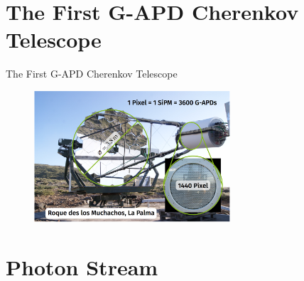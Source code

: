 



\maketitle

\section{The First G-APD Cherenkov Telescope}

\begin{frame}[t]{The First G-APD Cherenkov Telescope}

    \begin{figure}
        \centering\includegraphics[width=0.65\textwidth]{fig/fact.png}
    \end{figure}

\end{frame}

\section{Photon Stream}

